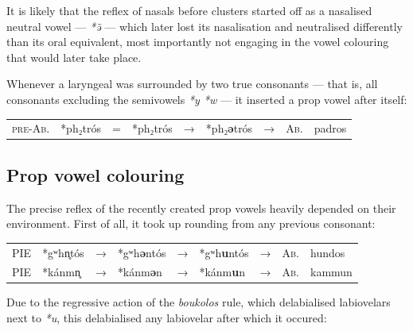 \documentclass[svgnames,x11names,b5paper]{book}
\begin{document}
            It is likely that the reflex of nasals before clusters started off as a nasalised neutral vowel — \textit{*ə̃} — which later lost its nasalisation and neutralised differently than its oral equivalent, most importantly not engaging in the vowel colouring that would later take place.

        Whenever a laryngeal was surrounded by two true consonants — that is, all consonants excluding the semivowels \textit{*y *w} — it inserted a prop vowel after itself:

            \begin{table}[H]
                \begin{center}
                \begin{tabular}{llcllllll}
                \textsc{pre-Ab.} & *ph₂trós & = & *ph₂trós & → & *ph₂\textbf{ǝ}trós & → & \textsc{Ab.} & padros\\
                \end{tabular}
                \end{center}
                \end{table}
        
            \subsection{Prop vowel colouring}
        
        The precise reflex of the recently created prop vowels heavily depended on their environment. First of all, it took up rounding from any previous consonant:

            \begin{table}[H]
                \begin{center}
                \begin{tabular}{llcllllll}
                \textsc{PIE} & *gʷhn̥tós & → & *gʷh\textbf{ǝ}ntós & → & *gʷh\textbf{u}ntós & → & \textsc{Ab.} & hundos\\
                \textsc{PIE} & *kánmn̥ & → & *kánm\textbf{ǝ}n & → & *kánm\textbf{u}n & → & \textsc{Ab.} & kammun\\
                \end{tabular}
                \end{center}
                \end{table}
        
        Due to the regressive action of the \textit{boukolos} rule, which delabialised labiovelars next to \textit{*u}, this delabialised any labiovelar after which it occured:
\end{document}
